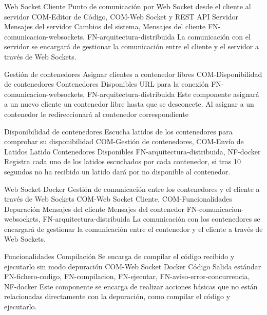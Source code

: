 \begin{component}{Web Socket Cliente}
{Punto de comunicación por Web Socket desde el cliente al servidor}
{COM-Editor de Código, COM-Web Socket y REST API Servidor} %
{Mensajes del servidor} %
{Cambios del sistema, Mensajes del cliente} %
{FN-comunicacion-websockets, FN-arquitectura-distribuida} %
La comunicación con el servidor se encargará de gestionar la comunicación entre el cliente y el servidor a través de Web Sockets. %
\end{component}


\begin{component}{Gestión de contenedores}
{Asignar clientes a contenedor libres}
{COM-Disponibilidad de contenedores} %
{Contenedores Disponibles} %
{URL para la conexión} %
{FN-comunicacion-websockets, FN-arquitectura-distribuida} %
Este componente asignará a un nuevo cliente un contenedor libre hasta que se desconecte. Al asignar a un contenedor le redireccionará al contenedor correspondiente %
\end{component}

\begin{component}{Disponibilidad de contenedores}
{Escucha latidos de los contenedores para comprobar su disponibilidad }
{COM-Gestión de contenedores, COM-Envío de Latidos} %
{Latido} %
{Contenedores Disponibles} %
{FN-arquitectura-distribuida, NF-docker} %
Registra cada uno de los latidos escuchados por cada contenedor, si tras 10 segundos no ha recibido un latido dará por no disponible al contenedor. %
\end{component}


\begin{component}{Web Socket Docker}
{Gestión de comunicación entre los contenedores y el cliente a través de Web Sockets}
{COM-Web Socket Cliente, COM-Funcionalidades Depuración} %
{Mensajes del cliente} %
{Mensajes del contenedor} %
{FN-comunicacion-websockets, FN-arquitectura-distribuida} %
La comunicación con los contenedores se encargará de gestionar la comunicación entre el contenedor y el cliente a través de Web Sockets. %
\end{component}

\begin{component}{Funcionalidades Compilación}
{Se encarga de compilar el código recibido y ejecutarlo sin modo depuración}
{COM-Web Socket Docker}
{Código}
{Salida estándar}
{FN-fichero-codigo, FN-compilacion, FN-ejecutar, FN-aviso-error-concurrencia, NF-docker}
Este componente se encarga de realizar acciones básicas que no están relacionadas directamente con la depuración, como compilar el código y ejecutarlo.
\end{component}


